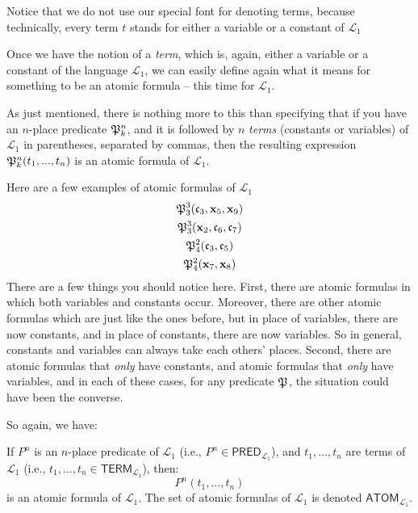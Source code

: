 \begin{remark}
Notice that we do not use our special font for denoting terms, because technically, every term $t$ stands for either a variable or a constant of $\mathcal{L}_1$ 
\end{remark}

Once we have the notion of a \textit{term}, which is, again, either a variable or a constant of the language $\mathcal{L}_1$, we can easily define again what it means for something to be an atomic formula -- this time for $\mathcal{L}_1$.

As just mentioned, there is nothing more to this than specifying that if you have an $n$-place predicate $\mathfrak{P}^{n}_{k}$, and it is followed by $n$ \textit{terms} (constants or variables) of $\mathcal{L}_1$ in parentheses, separated by commas, then the resulting expression $\mathfrak{P}^{n}_{k}(t_1, ..., t_n)$ is an atomic formula of $\mathcal{L}_1$.

Here are a few examples of atomic formulas of $\mathcal{L}_1$
%
\begin{gather*}
	\mathfrak{P}^{3}_{3}(\mathfrak{c}_{3},  \mathbf{x}_{5}, \mathbf{x}_{9})\\
	\mathfrak{P}^{3}_{3}(\mathbf{x}_{2},  \mathfrak{c}_{6}, \mathfrak{c}_{7})\\
	\mathfrak{P}^{2}_{4}(\mathfrak{c}_{3}, \mathfrak{c}_{5})\\
	\mathfrak{P}^{2}_{4}(\mathbf{x}_{7}, \mathbf{x}_{8})
\end{gather*}
%
There are a few things you should notice here. First, there are atomic formulas in which both variables and constants occur. Moreover, there are other atomic formulas which are just like the ones before, but in place of variables, there are now constants, and in place of constants, there are now variables. So in general, constants and variables can always take each others' places. Second, there are atomic formulas that \textit{only} have constants, and atomic formulas that \textit{only} have variables, and in each of these cases, for any predicate $\mathfrak{P}^{}_{}$, the situation could have been the converse.

So again, we have:

\begin{defn}
If $P^n$ is an $n$-place predicate of $\mathcal{L}_1$ (i.e., $P^n \in \textsf{PRED}_{\mathcal{L}_1}$), and $t_1, ..., t_n$ are terms of $\mathcal{L}_1$ (i.e., $t_1, ..., t_n \in \mathsf{TERM}_{\mathcal{L}_1}$), then:
\[
P^n(t_1, ..., t_n)
\]
is an atomic formula of $\mathcal{L}_1$. The set of atomic formulas of $\mathcal{L}_1$ is denoted $\textsf{ATOM}_{\mathcal{L}_1}$.
\end{defn}

